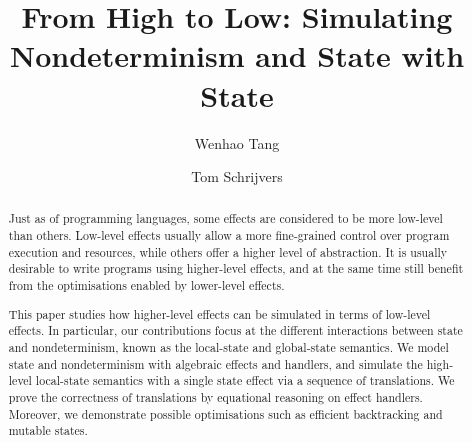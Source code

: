 \documentclass{jfp}
\begin{document}


\totalpg{\pageref{lastpage01}}

\title{From High to Low: Simulating Nondeterminism and State with State}

\begin{authgrp}
\author{Wenhao Tang}
\end{authgrp}
\begin{authgrp}
\author{Tom Schrijvers}
\end{authgrp}

\begin{abstract}
  Just as of programming languages, some effects are considered to be
  more low-level than others. Low-level effects usually allow a more
  fine-grained control over program execution and resources, while
  others offer a higher level of abstraction. It is usually desirable
  to write programs using higher-level effects, and at the same time
  still benefit from the optimisations enabled by lower-level effects.

  This paper studies how higher-level effects can be simulated in
  terms of low-level effects.
  In particular, our contributions focus at the different interactions
  between state and nondeterminism, known as the local-state and
  global-state semantics.
  We model state and nondeterminism with algebraic effects and
  handlers, and simulate the high-level local-state semantics with a
  single state effect via a sequence of translations.
  We prove the correctness of translations by equational reasoning on
  effect handlers.
  Moreover, we demonstrate possible optimisations such as efficient
  backtracking and mutable states.
\end{abstract}

\maketitle
\end{document}
